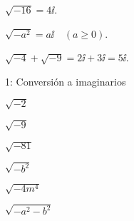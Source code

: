 
\begin{ejemplos}
  \item \(\sqrt{-16} = 4\ii\).
  \item \(\sqrt{-a^2} = a\ii \quad (a \ge 0)\).
  \item \(\sqrt{-4} + \sqrt{-9} = 2\ii + 3\ii = 5\ii\).
\end{ejemplos}

\begin{actividad}{1: Conversión a imaginarios}
  \item \(\sqrt{-2}\)
  \item \(\sqrt{-9}\)
  \item \(\sqrt{-81}\)
  \item \(\sqrt{-b^2}\)
  \item \(\sqrt{-4m^4}\)
  \item \(\sqrt{-a^2-b^2}\)
\end{actividad}